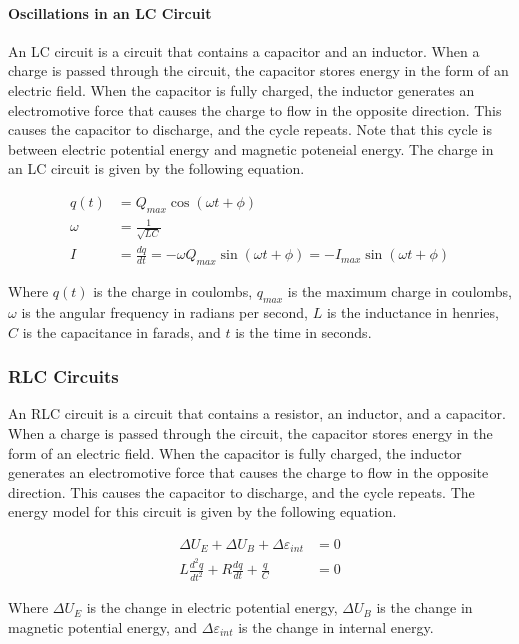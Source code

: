\paragraph*{Oscillations in an LC Circuit}
An LC circuit is a circuit that contains a capacitor and an inductor. When a charge is passed through the circuit, the capacitor stores energy in the form of 
an electric field. When the capacitor is fully charged, the inductor generates an electromotive force that causes the charge to flow in the opposite direction.
This causes the capacitor to discharge, and the cycle repeats. Note that this cycle is between electric potential energy and magnetic poteneial
energy. The charge in an LC circuit is given by the following equation.

\begin{align*}
    q(t) &= Q_{max}\cos(\omega t + \phi)\\
    \omega &= \frac{1}{\sqrt{LC}}\\
    I &= \frac{dq}{dt} = -\omega Q_{max}\sin(\omega t + \phi) = -I_{max}\sin(\omega t + \phi)
\end{align*}

Where $q(t)$ is the charge in coulombs, $q_{max}$ is the maximum charge in coulombs, $\omega$ is the angular frequency in radians per second, $L$ is the 
inductance in henries, $C$ is the capacitance in farads, and $t$ is the time in seconds.\\

\subsubsection*{RLC Circuits}
An RLC circuit is a circuit that contains a resistor, an inductor, and a capacitor. When a charge is passed through the circuit, the capacitor stores energy 
in the form of an electric field. When the capacitor is fully charged, the inductor generates an electromotive force that causes the charge to flow in the 
opposite direction. This causes the capacitor to discharge, and the cycle repeats. The energy model for this circuit is given by the following equation.

\begin{align*}
    \Delta U_E + \Delta U_B + \Delta \varepsilon_{int} &= 0\\
    L\frac{d^2q}{dt^2} + R\frac{dq}{dt} + \frac{q}{C} &= 0
\end{align*}

Where $\Delta U_E$ is the change in electric potential energy, $\Delta U_B$ is the change in magnetic potential energy, and $\Delta \varepsilon_{int}$ is the 
change in internal energy.\\

